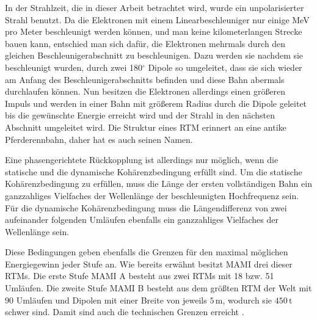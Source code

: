 \documentclass[a4paper,11pt,oneside,final,german,openbib,pdftex]{scrbook}
\begin{document}
{In der Strahlzeit, die in dieser Arbeit betrachtet wird, wurde ein unpolarisierter Strahl benutzt.
\newline
Da die Elektronen mit einem Linearbeschleuniger nur einige MeV pro Meter beschleunigt werden k\"onnen, und man keine kilometerlangen Strecke bauen kann, entschied man sich daf\"ur, die Elektronen mehrmals durch den gleichen Beschleunigerabschnitt zu beschleunigen. Dazu werden sie nachdem sie beschleunigt wurden, durch zwei 180$^{\circ}$ Dipole so umgeleitet, dass sie sich wieder am Anfang des Beschleunigerabschnitts befinden und diese Bahn abermals durchlaufen können. Nun besitzen die Elektronen allerdings einen gr\"o{\ss}eren Impuls und werden in einer Bahn mit gr\"o{\ss}erem Radius durch die Dipole geleitet bis die gew\"unschte Energie erreicht wird und der Strahl in den n\"achsten Abschnitt umgeleitet wird. Die Struktur eines RTM erinnert an eine antike Pferderennbahn, daher hat es auch seinen Namen.

 Eine phasengerichtete R\"uckkopplung ist allerdings nur m\"oglich, wenn die statische und die dynamische Koh\"arenzbedingung erf\"ullt sind. Um die statische Koh\"arenzbedingung zu erf\"ullen, muss die L\"ange der ersten vollst\"andigen Bahn ein ganzzahliges Vielfaches der Wellenl\"ange der beschleunigten Hochfrequenz sein. F\"ur die dynamische Koh\"arenzbedingung muss die L\"angendifferenz von zwei aufeinander folgenden Uml\"aufen ebenfalls ein ganzzahliges Vielfaches der Wellenl\"ange sein\cite{Un08}. 
 
 Diese Bedingungen geben ebenfalls die Grenzen f\"ur den maximal m\"oglichen Energiegewinn jeder Stufe an. 
\newline
Wie bereits erw\"ahnt besitzt MAMI drei dieser RTMs. Die erste Stufe MAMI A besteht aus zwei RTMs mit 18 bzw. 51 Uml\"aufen. Die zweite Stufe MAMI B besteht aus dem gr\"o{\ss}ten RTM der Welt mit 90 Uml\"aufen und Dipolen mit einer Breite von jeweils $5\, \text{m}$, wodurch sie $450\, \text{t}$ schwer sind. Damit sind auch die technischen Grenzen erreicht \cite{KPh11F}.


}
\end{document}
